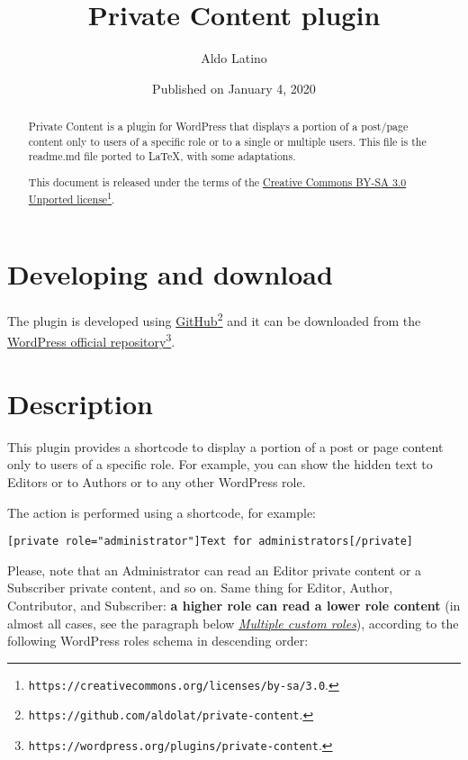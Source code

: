 \documentclass[a4paper,10pt]{article}
\title{Private Content plugin}
\author{Aldo Latino}
\date{Published on January 4, 2020}
\begin{document}
\maketitle

\begin{abstract}
\noindent Private Content is a plugin for WordPress that displays a portion of a post/page content only to users of a specific role or to a single or multiple users. This file is the readme.md file ported to \LaTeX, with some adaptations.

This document is released under the terms of the \href{https://creativecommons.org/licenses/by-sa/3.0}{Creative Commons BY-SA 3.0 Unported license}\footnote{\texttt{https://creativecommons.org/licenses/by-sa/3.0}.}.
\end{abstract}

\tableofcontents

\listoftables

\section{Developing and download}

The plugin is developed using \href{https://github.com/aldolat/private-content}{GitHub}\footnote{\texttt{https://github.com/aldolat/private-content}.} and it can be downloaded from the \href{https://wordpress.org/plugins/private-content}{WordPress official repository}\footnote{\texttt{https://wordpress.org/plugins/private-content}.}.

\section{Description}

This plugin provides a shortcode to display a portion of a post or page content only to users of a specific role. For example, you can show the hidden text to Editors or to Authors or to any other WordPress role.

The action is performed using a shortcode, for example:

\begin{lstlisting}
[private role="administrator"]Text for administrators[/private]
\end{lstlisting}

Please, note that an Administrator can read an Editor private content or a Subscriber private content, and so on. Same thing for Editor, Author, Contributor, and Subscriber: \textbf{a higher role can read a lower role content} (in almost all cases, see the paragraph below \textit{\hyperref[multiple-custom-roles]{Multiple custom roles}}), according to the following WordPress roles schema in descending order:
\end{document}

